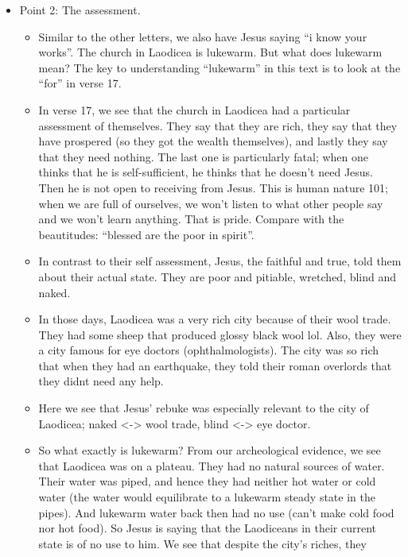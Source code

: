 \begin{itemize}
{\begin{itemize}
{    Sometimes we know these titles but we forget their significance.  We need
    to hear them anew to learn that we must submit to Jesus’ voice.}
  \end{itemize} }
  \item{Point 2: The assessment.
  \begin{itemize}
    \item{Similar to the other letters, we also have Jesus saying “i know your works”. The church in Laodicea is lukewarm. But what does lukewarm mean? The key to understanding “lukewarm” in this text is to look at the “for” in verse 17.}
    \item{In verse 17, we see that the church in Laodicea had a particular
    assessment of themselves.  They say that they are rich, they say that
    they have prospered (so they got the wealth themselves), and lastly they
    say that they need nothing.  The last one is particularly fatal; when one
    thinks that he is self-sufficient, he thinks that he doesn’t need Jesus.
    Then he is not open to receiving from Jesus.  This is human nature 101;
    when we are full of ourselves, we won’t listen to what other people say
    and we won’t learn anything.  That is pride.  Compare with the
    beautitudes: “blessed are the poor in spirit”.}
    \item{In contrast to their self assessment, Jesus, the faithful and true, told them about their actual state. They are poor and pitiable, wretched, blind and naked.}
    \item{In those days, Laodicea was a very rich city because of their wool trade. They had some sheep that produced glossy black wool lol. Also, they were a city famous for eye doctors (ophthalmologists). The city was so rich that when they had an earthquake, they told their roman overlords that they didnt need any help. }
    \item{Here we see that Jesus' rebuke was especially relevant to the city of Laodicea; naked <-> wool trade, blind <-> eye doctor.}
    \item{So what exactly is lukewarm?  From our archeological evidence, we
    see that Laodicea was on a plateau.  They had no natural sources of
    water.  Their water was piped, and hence they had neither hot water or
    cold water (the water would equilibrate to a lukewarm steady state in the
    pipes).  And lukewarm water back then had no use (can’t make cold food
    nor hot food).  So Jesus is saying that the Laodiceans in their current
    state is of no use to him.  We see that despite the city’s riches, they
}
\end{itemize}}
\end{itemize}

